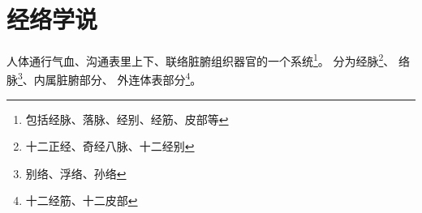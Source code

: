 \section{经络学说}
人体通行气血、沟通表里上下、联络脏腑组织器官的一个系统\footnote{包括经脉、落脉、经别、经筋、皮部等}。
分为经脉\footnote{十二正经、奇经八脉、十二经别}、
络脉\footnote{别络、浮络、孙络}、内属脏腑部分、
外连体表部分\footnote{十二经筋、十二皮部}。
